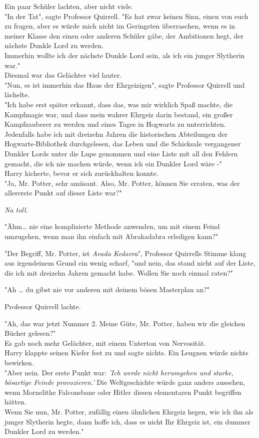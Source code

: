 {Ein paar Schüler lachten, aber nicht viele.\\ "In der Tat", sagte Professor Quirrell. "Es hat zwar keinen Sinn, einen von euch zu fragen, aber es würde mich nicht im Geringsten überraschen, wenn es in meiner Klasse den einen oder anderen Schüler gäbe, der Ambitionen hegt, der nächste Dunkle Lord zu werden.\\ Immerhin wollte ich der nächste Dunkle Lord sein, als ich ein junger Slytherin war."\\ Diesmal war das Gelächter viel lauter.\\ "Nun, es ist immerhin das Haus der Ehrgeizigen", sagte Professor Quirrell und lächelte.\\ "Ich habe erst später erkannt, dass das, was mir wirklich Spaß machte, die Kampfmagie war, und dass mein wahrer Ehrgeiz darin bestand, ein großer Kampfzauberer zu werden und eines Tages in Hogwarts zu unterrichten.\\ Jedenfalls habe ich mit dreizehn Jahren die historischen Abteilungen der Hogwarts-Bibliothek durchgelesen, das Leben und die Schicksale vergangener Dunkler Lords unter die Lupe genommen und eine Liste mit all den Fehlern gemacht, die ich nie machen würde, wenn ich ein Dunkler Lord wäre -"\\ Harry kicherte, bevor er sich zurückhalten konnte.\\ "Ja, Mr. Potter, sehr amüsant. Also, Mr. Potter, können Sie erraten, was der allererste Punkt auf dieser Liste war?"

\emph{Na toll.}

"Ähm… nie eine komplizierte Methode anwenden, um mit einem Feind umzugehen, wenn man ihn einfach mit Abrakadabra erledigen kann?"

"Der Begriff, Mr. Potter, ist \emph{Avada Kedavra}", Professor Quirrells Stimme klang aus irgendeinem Grund ein wenig scharf, "und nein, das stand nicht auf der Liste, die ich mit dreizehn Jahren gemacht habe. Wollen Sie noch einmal raten?"

"Ah … du gibst nie vor anderen mit deinem bösen Masterplan an?"

Professor Quirrell lachte.

"Ah, das war jetzt Nummer 2. Meine Güte, Mr. Potter, haben wir die gleichen Bücher gelesen?"\\ Es gab noch mehr Gelächter, mit einem Unterton von Nervosität.\\ Harry klappte seinen Kiefer fest zu und sagte nichts. Ein Leugnen würde nichts bewirken.\\ "Aber nein. Der erste Punkt war: \emph{'Ich werde nicht herumgehen und starke, bösartige Feinde provozieren.'} Die Weltgeschichte würde ganz anders aussehen, wenn Mornelithe Falconsbane oder Hitler diesen elementaren Punkt begriffen hätten.\\ Wenn Sie nun, Mr. Potter, zufällig einen ähnlichen Ehrgeiz hegen, wie ich ihn als junger Slytherin hegte, dann hoffe ich, dass es nicht Ihr Ehrgeiz ist, ein dummer Dunkler Lord zu werden."

}
